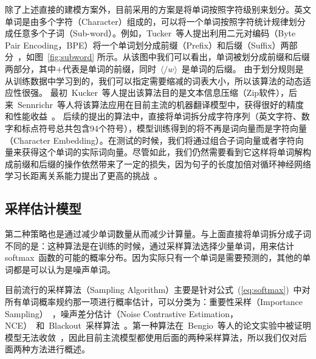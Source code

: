 除了上述直接的建模方案外，目前采用的方案是将单词按照字符级别来划分。英文单词是由多个字符（Character）组成的，可以将一个单词按照字符统计规律划分成任意多个子词（Sub-word）。例如，Tucker~等人提出利用二元对编码（Byte Pair Encoding，BPE）将一个单词划分成前缀（Prefix）和后缀（Suffix）两部分~，如图~\ref{fig:subword} 所示。从该图中我们可以看出，单词被划分成前缀和后缀两部分，其中$+$代表是单词的前缀，同时~$\langle /w \rangle$~是单词的后缀。
由于划分规则是从训练数据中学习到的，我们可以指定需要缩减的词表大小，所以该算法的动态适应性很强。
最初~Kucker~等人提出该算法目的是文本信息压缩（Zip软件），后来~Sennrichr~等人将该算法应用在目前主流的机器翻译模型中，获得很好的精度和性能收益~。
后续的提出的算法中，直接将单词拆分成字符序列（英文字符、数字和标点符号总共包含94个符号），模型训练得到的将不再是词向量而是字符向量（Character Embedding）。在测试的时候，我们将通过组合子词向量或者字符向量来获得这个单词的实际词向量。尽管如此，我们仍然需要看到它这样将单词解构成前缀和后缀的操作依然带来了一定的损失，因为句子的长度加倍对循环神经网络学习长距离关系能力提出了更高的挑战~。

\subsection{采样估计模型}
第二种策略也是通过减少单词数量从而减少计算量。与上面直接将单词拆分成子词不同的是：这种算法是在训练的时候，通过采样算法选择少量单词，用来估计softmax~函数的可能的概率分布。因为实际只有一个单词是需要预测的，其他的单词都是可以认为是噪声单词。

目前流行的采样算法（Sampling Algorithm）主要是针对公式~(\ref{eq:softmax})~中对所有单词概率规约那一项进行概率估计，可以分类为：重要性采样（Importance Sampling）~，噪声差分估计（Noise Contrastive Estimation，NCE）~和~Blackout~采样算法~。第一种算法在~Bengio~等人的论文实验中被证明模型无法收敛~，因此目前主流模型都使用后面的两种采样算法，所以我们仅对后面两种方法进行概述。

